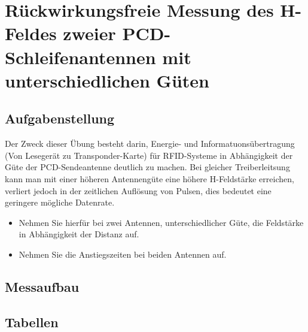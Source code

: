 \documentclass[12pt,a4paper,ngerman]{article}
\begin{document}


%
%

\section{Rückwirkungsfreie Messung des H-Feldes zweier PCD-Schleifenantennen mit unterschiedlichen Güten}
\subsection{Aufgabenstellung}
Der Zweck dieser Übung besteht darin, Energie- und Informatuonsübertragung (Von Lesegerät zu Transponder-Karte) für RFID-Systeme in Abhängigkeit der Güte der PCD-Sendeantenne deutlich zu machen. Bei gleicher Treiberleitsung kann man mit einer höheren Antennengüte eine höhere H-Feldstärke erreichen, verliert jedoch in der zeitlichen Auflösung von Pulsen, dies bedeutet eine geringere mögliche Datenrate. 
\begin{itemize}
\item Nehmen Sie hierfür bei zwei Antennen, unterschiedlicher Güte, die Feldstärke in Abhängigkeit der Distanz auf.
\item Nehmen Sie die Anstiegszeiten bei beiden Antennen auf.
\end{itemize}

\subsection{Messaufbau}

\subsection{Tabellen}
\end{document}
